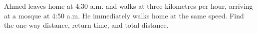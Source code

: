 Ahmed leaves home at 4:30 a.m. and walks at three kilometres per hour, arriving at a mosque at 4:50 a.m. He immediately walks home at the same speed. Find the one-way distance, return time, and total distance.
